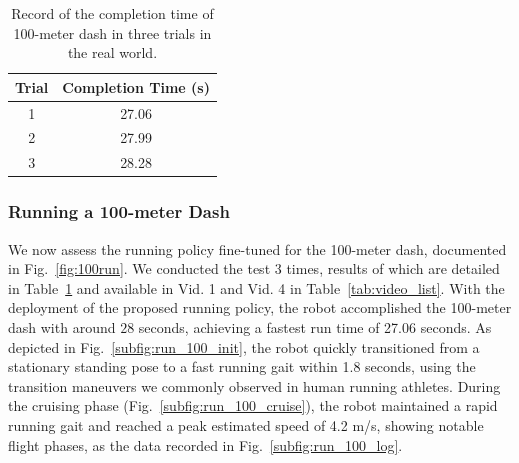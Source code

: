 \begin{table}[t]
\centering
\caption{Record of the completion time of 100-meter dash in three trials in the real world.}
\label{tab:100run}
\begin{tabular}{cc}
\hline
Trial & Completion Time (s) \\ \hline
1     & 27.06               \\
2     & 27.99               \\
3     & 28.28               \\ \hline
\end{tabular}
\end{table}





\subsubsection{Running a 100-meter Dash}
We now assess the running policy fine-tuned for the 100-meter dash, documented in Fig.~\ref{fig:100run}. We conducted the test 3 times, results of which are detailed in Table~\ref{tab:100run} and available in Vid. 1 and Vid. 4 in Table~\ref{tab:video_list}.
With the deployment of the proposed running policy, the robot accomplished the 100-meter dash with around $28$ seconds, achieving a fastest run time of 27.06 seconds. 
As depicted in Fig.~\ref{subfig:run_100_init}, the robot quickly transitioned from a stationary standing pose to a fast running gait within 1.8 seconds, using the transition maneuvers we commonly observed in human running athletes. 
During the cruising phase (Fig.~\ref{subfig:run_100_cruise}), the robot maintained a rapid running gait and reached a peak estimated speed of 4.2 m/s, showing notable flight phases, as the data recorded in Fig.~\ref{subfig:run_100_log}. 



